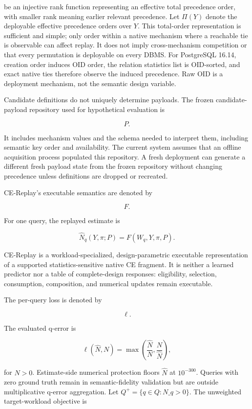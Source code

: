 \documentclass[sigconf,nonacm]{acmart}
\begin{document}
be an injective rank function representing an effective total precedence order, with smaller rank meaning earlier relevant precedence. Let $\Pi(Y)$ denote the deployable effective precedence orders over $Y$. This total-order representation is sufficient and simple; only order within a native mechanism where a reachable tie is observable can affect replay. It does not imply cross-mechanism competition or that every permutation is deployable on every DBMS. For PostgreSQL 16.14, creation order induces OID order, the relation statistics list is OID-sorted, and exact native ties therefore observe the induced precedence. Raw OID is a deployment mechanism, not the semantic design variable.

Candidate definitions do not uniquely determine payloads. The frozen candidate-payload repository used for hypothetical evaluation is

\[
P.
\]

It includes mechanism values and the schema needed to interpret them, including semantic key order and availability. The current system assumes that an offline acquisition process populated this repository. A fresh deployment can generate a different fresh payload state from the frozen repository without changing precedence unless definitions are dropped or recreated.

CE-Replay's executable semantics are denoted by

\[
F.
\]

For one query, the replayed estimate is

\[
\widehat{N}_q(Y,\pi;P)=F(W_q,Y,\pi,P).
\]

CE-Replay is a workload-specialized, design-parametric executable representation of a supported statistics-sensitive native CE fragment. It is neither a learned predictor nor a table of complete-design responses: eligibility, selection, consumption, composition, and numerical updates remain executable.

The per-query loss is denoted by

\[
\ell.
\]

The evaluated q-error is

\[
\ell(\widehat{N},N)
=
\max\!\left(
\frac{\widehat{N}}{N},
\frac{N}{\widehat{N}}
\right),
\]

for $N>0$. Estimate-side numerical protection floors $\widehat{N}$ at $10^{-300}$. Queries with zero ground truth remain in semantic-fidelity validation but are outside multiplicative q-error aggregation. Let $Q^+=\{q\in Q:N\_q>0\}$. The unweighted target-workload objective is
\end{document}
